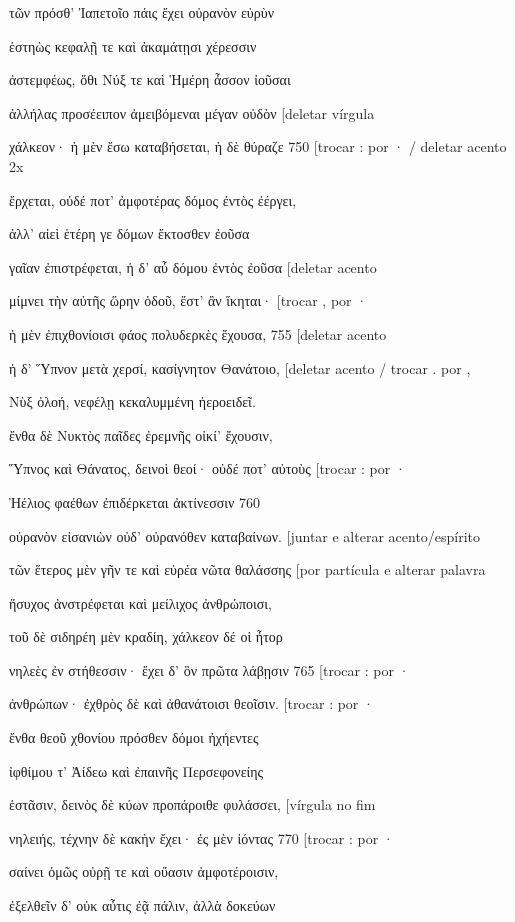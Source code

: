 τῶν πρόσθ' Ἰαπετοῖο πάις ἔχει οὐρανὸν εὐρὺν

ἑστηὼς κεφαλῇ τε καὶ ἀκαμάτῃσι χέρεσσιν

ἀστεμφέως, ὅθι Νύξ τε καὶ Ἡμέρη ἆσσον ἰοῦσαι

ἀλλήλας προσέειπον ἀμειβόμεναι μέγαν οὐδὸν {[}deletar vírgula

χάλκεον· ἡ μὲν ἔσω καταβήσεται, ἡ δὲ θύραζε 750 {[}trocar : por · /
deletar acento 2x

ἔρχεται, οὐδέ ποτ' ἀμφοτέρας δόμος ἐντὸς ἐέργει,

ἀλλ' αἰεὶ ἑτέρη γε δόμων ἔκτοσθεν ἐοῦσα

γαῖαν ἐπιστρέφεται, ἡ δ' αὖ δόμου ἐντὸς ἐοῦσα {[}deletar acento

μίμνει τὴν αὐτῆς ὥρην ὁδοῦ, ἔστ' ἂν ἵκηται· {[}trocar , por ·

ἡ μὲν ἐπιχθονίοισι φάος πολυδερκὲς ἔχουσα, 755 {[}deletar acento

ἡ δ' Ὕπνον μετὰ χερσί, κασίγνητον Θανάτοιο, {[}deletar acento / trocar .
por ,

Νὺξ ὀλοή, νεφέλῃ κεκαλυμμένη ἠεροειδεῖ.

ἔνθα δὲ Νυκτὸς παῖδες ἐρεμνῆς οἰκί' ἔχουσιν,

Ὕπνος καὶ Θάνατος, δεινοὶ θεοί· οὐδέ ποτ' αὐτοὺς {[}trocar : por ·

Ἠέλιος φαέθων ἐπιδέρκεται ἀκτίνεσσιν 760

οὐρανὸν εἰσανιὼν οὐδ' οὐρανόθεν καταβαίνων. {[}juntar e alterar
acento/espírito

τῶν ἕτερος μὲν γῆν τε καὶ εὐρέα νῶτα θαλάσσης {[}por partícula e alterar
palavra

ἥσυχος ἀνστρέφεται καὶ μείλιχος ἀνθρώποισι,

τοῦ δὲ σιδηρέη μὲν κραδίη, χάλκεον δέ οἱ ἦτορ

νηλεὲς ἐν στήθεσσιν· ἔχει δ' ὃν πρῶτα λάβῃσιν 765 {[}trocar : por ·

ἀνθρώπων· ἐχθρὸς δὲ καὶ ἀθανάτοισι θεοῖσιν. {[}trocar : por ·

ἔνθα θεοῦ χθονίου πρόσθεν δόμοι ἠχήεντες

ἰφθίμου τ' Ἀίδεω καὶ ἐπαινῆς Περσεφονείης

ἑστᾶσιν, δεινὸς δὲ κύων προπάροιθε φυλάσσει, {[}vírgula no fim

νηλειής, τέχνην δὲ κακὴν ἔχει· ἐς μὲν ἰόντας 770 {[}trocar : por ·

σαίνει ὁμῶς οὐρῇ τε καὶ οὔασιν ἀμφοτέροισιν,

ἐξελθεῖν δ' οὐκ αὖτις ἐᾷ πάλιν, ἀλλὰ δοκεύων

